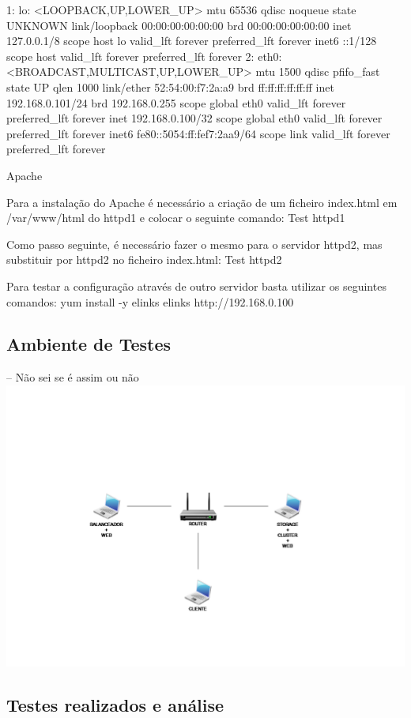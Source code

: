 1: lo: <LOOPBACK,UP,LOWER_UP> mtu 65536 qdisc noqueue state UNKNOWN
link/loopback 00:00:00:00:00:00 brd 00:00:00:00:00:00
inet 127.0.0.1/8 scope host lo
valid_lft forever preferred_lft forever
inet6 ::1/128 scope host
valid_lft forever preferred_lft forever
2: eth0: <BROADCAST,MULTICAST,UP,LOWER_UP> mtu 1500 qdisc pfifo_fast state UP qlen 1000
link/ether 52:54:00:f7:2a:a9 brd ff:ff:ff:ff:ff:ff
inet 192.168.0.101/24 brd 192.168.0.255 scope global eth0
valid_lft forever preferred_lft forever
inet 192.168.0.100/32 scope global eth0
valid_lft forever preferred_lft forever
inet6 fe80::5054:ff:fef7:2aa9/64 scope link
valid_lft forever preferred_lft forever

Apache

Para a instalação do Apache é necessário a criação de um ficheiro index.html em /var/www/html do httpd1 e colocar o seguinte comando:
Test httpd1

Como passo seguinte, é necessário fazer o mesmo para o servidor httpd2, mas substituir por httpd2 no ficheiro index.html:
Test httpd2

Para testar a configuração através de outro servidor basta utilizar os seguintes comandos:
yum install -y elinks
elinks http://192.168.0.100

\subsection{Ambiente de Testes}

-- Não sei se é assim ou não
\includegraphics[scale=.4]{img/AmbienteDeTestes}

\subsection{Testes realizados e análise}

